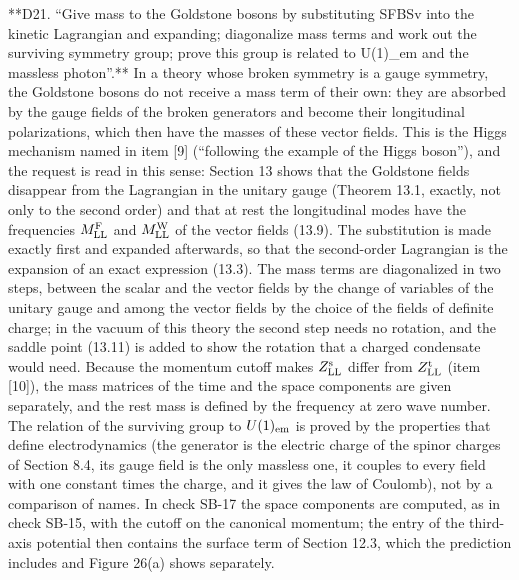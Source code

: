 \documentclass[
  10pt,
]{article}
\begin{document}
**D21. ``Give mass to the Goldstone bosons by substituting SFBSv into
the kinetic Lagrangian and expanding; diagonalize mass terms and work
out the surviving symmetry group; prove this group is related to
U(1)\_em and the massless photon''.** In a theory whose broken symmetry
is a gauge symmetry, the Goldstone bosons do not receive a mass term of
their own: they are absorbed by the gauge fields of the broken
generators and become their longitudinal polarizations, which then have
the masses of these vector fields. This is the Higgs mechanism named in
item {[}9{]} (``following the example of the Higgs boson''), and the
request is read in this sense: Section 13 shows that the Goldstone
fields disappear from the Lagrangian in the unitary gauge (Theorem 13.1,
exactly, not only to the second order) and that at rest the longitudinal
modes have the frequencies \(M^{\rm F}_{\rm LL}\) and
\(M^{\rm W}_{\rm LL}\) of the vector fields (13.9). The substitution is
made exactly first and expanded afterwards, so that the second-order
Lagrangian is the expansion of an exact expression (13.3). The mass
terms are diagonalized in two steps, between the scalar and the vector
fields by the change of variables of the unitary gauge and among the
vector fields by the choice of the fields of definite charge; in the
vacuum of this theory the second step needs no rotation, and the saddle
point (13.11) is added to show the rotation that a charged condensate
would need. Because the momentum cutoff makes \(Z^{\rm s}_{\rm LL}\)
differ from \(Z^{\rm t}_{\rm LL}\) (item {[}10{]}), the mass matrices of
the time and the space components are given separately, and the rest
mass is defined by the frequency at zero wave number. The relation of
the surviving group to \(U(1)_{\rm em}\) is proved by the properties
that define electrodynamics (the generator is the electric charge of the
spinor charges of Section 8.4, its gauge field is the only massless one,
it couples to every field with one constant times the charge, and it
gives the law of Coulomb), not by a comparison of names. In check SB-17
the space components are computed, as in check SB-15, with the cutoff on
the canonical momentum; the entry of the third-axis potential then
contains the surface term of Section 12.3, which the prediction includes
and Figure 26(a) shows separately.
\end{document}
